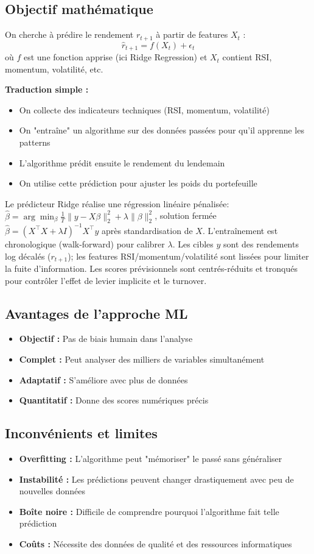 \documentclass[11pt,a4paper]{article}
\begin{document}
\subsection{Objectif mathématique}
On cherche à prédire le rendement \(r_{t+1}\) à partir de features \(X_t\) :
\[\hat{r}_{t+1} = f(X_t) + \epsilon_t\]
où \(f\) est une fonction apprise (ici Ridge Regression) et \(X_t\) contient RSI, momentum, volatilité, etc.

\textbf{Traduction simple :} 
\begin{itemize}
\item On collecte des indicateurs techniques (RSI, momentum, volatilité)
\item On "entraîne" un algorithme sur des données passées pour qu'il apprenne les patterns
\item L'algorithme prédit ensuite le rendement du lendemain
\item On utilise cette prédiction pour ajuster les poids du portefeuille
\end{itemize}
\noindent Le prédicteur Ridge réalise une régression linéaire pénalisée: \(\hat{\beta}=\arg\min_\beta \frac{1}{T}\lVert y - X\beta\rVert_2^2 + \lambda \lVert\beta\rVert_2^2\), solution fermée \(\hat{\beta}=(X^\top X + \lambda I)^{-1}X^\top y\) après standardisation de \(X\). L'entraînement est chronologique (walk-forward) pour calibrer \(\lambda\). Les cibles \(y\) sont des rendements log décalés (\(r_{t+1}\)); les features RSI/momentum/volatilité sont lissées pour limiter la fuite d'information. Les scores prévisionnels sont centrés-réduits et tronqués pour contrôler l'effet de levier implicite et le turnover.

\subsection{Avantages de l'approche ML}
\begin{itemize}
\item \textbf{Objectif :} Pas de biais humain dans l'analyse
\item \textbf{Complet :} Peut analyser des milliers de variables simultanément
\item \textbf{Adaptatif :} S'améliore avec plus de données
\item \textbf{Quantitatif :} Donne des scores numériques précis
\end{itemize}

\subsection{Inconvénients et limites}
\begin{itemize}
\item \textbf{Overfitting :} L'algorithme peut "mémoriser" le passé sans généraliser
\item \textbf{Instabilité :} Les prédictions peuvent changer drastiquement avec peu de nouvelles données
\item \textbf{Boîte noire :} Difficile de comprendre pourquoi l'algorithme fait telle prédiction
\item \textbf{Coûts :} Nécessite des données de qualité et des ressources informatiques
\end{itemize}
\end{document}
